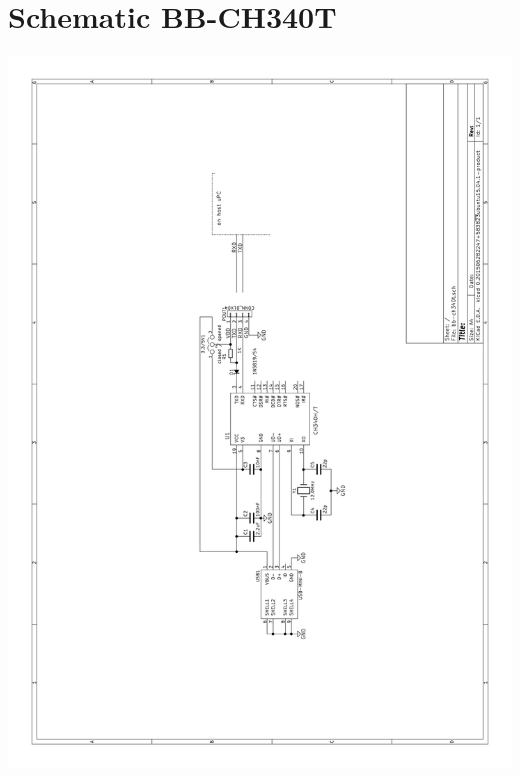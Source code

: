 \documentclass[a4paper,ngerman]{scrartcl}
\begin{document}
\section{Schematic BB-CH340T}
\label{sec:schematic}
\includegraphics[scale=0.2]{bb_ch340t.png}
\end{document}
